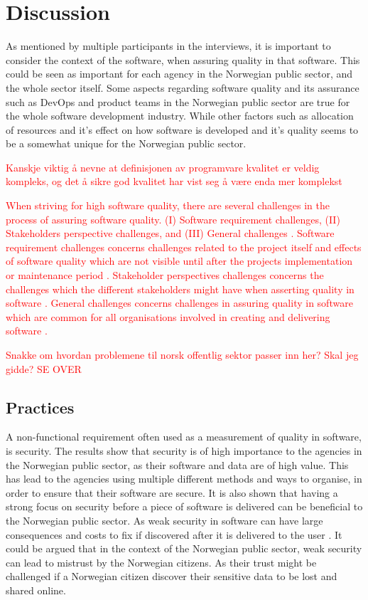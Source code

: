 \chapter{Discussion}
As mentioned by multiple participants in the interviews, it is important to consider the context of the software, when assuring quality in that software. This could be seen as important for each agency in the Norwegian public sector, and the whole sector itself. Some aspects regarding software quality and its assurance such as DevOps and product teams in the Norwegian public sector are true for the whole software development industry. While other factors such as allocation of resources and it's effect on how software is developed and it's quality seems to be a somewhat unique for the Norwegian public sector.

\textcolor{red}{Kanskje viktig å nevne at definisjonen av programvare kvalitet er veldig kompleks, og det å sikre god kvalitet har vist seg å være enda mer komplekst}

\textcolor{red}{When striving for high software quality, there are several challenges in the process of assuring software quality. (I) Software requirement challenges, (II) Stakeholders perspective challenges, and (III) General challenges \cite{sh_2018}. Software requirement challenges concerns challenges related to the project itself and effects of software quality which are not visible until after the projects implementation or maintenance period \cite{sh_2018}. Stakeholder perspectives challenges concerns the challenges which the different stakeholders might have when asserting quality in software \cite{sh_2018}. General challenges concerns challenges in assuring quality in software which are common for all organisations involved in creating and delivering software \cite{sh_2018}.}

\textcolor{red}{Snakke om hvordan problemene til norsk offentlig sektor passer inn her? Skal jeg gidde? SE OVER}

\section{Practices}
A non-functional requirement often used as a measurement of quality in software, is security. The results show that security is of high importance to the agencies in the Norwegian public sector, as their software and data are of high value. This has lead to the agencies using multiple different methods and ways to organise, in order to ensure that their software are secure. It is also shown that having a strong focus on security before a piece of software is delivered can be beneficial to the Norwegian public sector. As weak security in software can have large consequences and costs to fix if discovered after it is delivered to the user \cite{csw_2011}. It could be argued that in the context of the Norwegian public sector, weak security can lead to mistrust by the Norwegian citizens. As their trust might be challenged if a Norwegian citizen discover their sensitive data to be lost and shared online.

